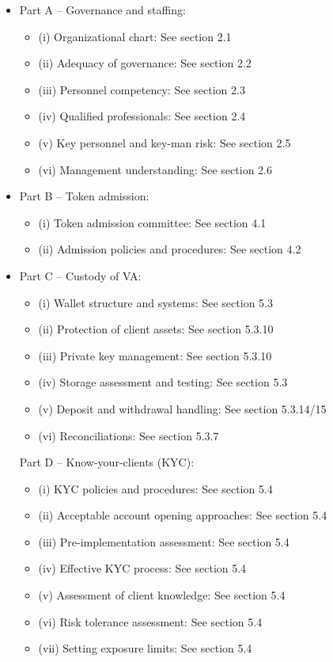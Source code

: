 \documentclass[]{report}
\begin{document}
\begin{itemize}
\item Part A – Governance and staffing:
  \begin{itemize}
\item (i) Organizational chart: See section 2.1
\item (ii) Adequacy of governance: See section 2.2
\item (iii) Personnel competency: See section 2.3
\item (iv) Qualified professionals: See section 2.4
\item (v) Key personnel and key-man risk: See section 2.5
\item (vi) Management understanding: See section 2.6
\end{itemize}
\item Part B – Token admission:
\begin{itemize}
\item (i) Token admission committee: See section 4.1
\item (ii) Admission policies and procedures: See section 4.2
\end{itemize}

\item Part C – Custody of VA:
\begin{itemize}
\item (i) Wallet structure and systems: See section 5.3
\item (ii) Protection of client assets: See section 5.3.10
\item (iii) Private key management: See section 5.3.10
\item (iv) Storage assessment and testing: See section 5.3
\item (v) Deposit and withdrawal handling: See section 5.3.14/15
\item (vi) Reconciliations: See section 5.3.7
\end{itemize}

Part D – Know-your-clients (KYC):
\begin{itemize}
\item (i) KYC policies and procedures: See section 5.4
\item (ii) Acceptable account opening approaches: See section 5.4
\item (iii) Pre-implementation assessment: See section 5.4
\item (iv) Effective KYC process: See section 5.4
\item (v) Assessment of client knowledge: See section 5.4
\item (vi) Risk tolerance assessment: See section 5.4
\item (vii) Setting exposure limits: See section 5.4
\end{itemize}


\end{itemize}
\end{document}
